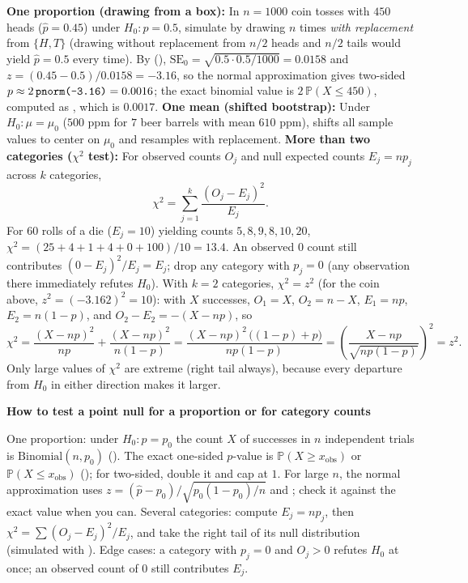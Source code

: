 \documentclass[10pt]{scrartcl}
\newenvironment{howto}[1]{\begin{mdframed}[style=howtostyle]{\color{NavyBlue}\textbf{#1}}\par\vspace{2pt}}{\end{mdframed}}
\begin{document}
\begin{itemize}
  \ii \textbf{One proportion (drawing from a box):} In $n = 1000$ coin tosses with $450$ heads ($\hat p = 0.45$) under $H_0\colon p = 0.5$, simulate by drawing $n$ times \emph{with replacement} from $\{H, T\}$ (drawing without replacement from $n/2$ heads and $n/2$ tails would yield $\hat p = 0.5$ every time). By (), $\mathrm{SE}_0 = \sqrt{0.5 \cdot 0.5 / 1000} = 0.0158$ and $z = (0.45 - 0.5)/0.0158 = -3.16$, so the normal approximation gives two-sided $p \approx 2\,\texttt{pnorm(-3.16)} = 0.0016$; the exact binomial value is $2\,\mathbb P(X \le 450)$, computed as , which is $0.0017$.
  \ii \textbf{One mean (shifted bootstrap):} Under $H_0\colon \mu = \mu_0$ ($500\text{ ppm}$ for $7$ beer barrels with mean $610\text{ ppm}$),  shifts all sample values to center on $\mu_0$ and resamples with replacement.
  \ii \textbf{More than two categories ($\chi^2$ test):} For observed counts $O_j$ and null expected counts $E_j = np_j$ across $k$ categories,
  \[
    \chi^2 = \sum_{j=1}^k \frac{(O_j - E_j)^2}{E_j}.
  \]
  For $60$ rolls of a die ($E_j = 10$) yielding counts $5, 8, 9, 8, 10, 20$, $\chi^2 = (25+4+1+4+0+100)/10 = 13.4$. An observed $0$ count still contributes $(0 - E_j)^2/E_j = E_j$; drop any category with $p_j = 0$ (any observation there immediately refutes $H_0$). With $k = 2$ categories, $\chi^2 = z^2$ (for the coin above, $z^2 = (-3.162)^2 = 10$): with $X$ successes, $O_1 = X$, $O_2 = n - X$, $E_1 = np$, $E_2 = n(1-p)$, and $O_2 - E_2 = -(X - np)$, so
  \[
    \chi^2 = \frac{(X-np)^2}{np} + \frac{(X-np)^2}{n(1-p)} = \frac{(X-np)^2\,\big((1-p) + p\big)}{np(1-p)} = \left(\frac{X - np}{\sqrt{np(1-p)}}\right)^2 = z^2 .
  \]
  Only large values of $\chi^2$ are extreme (right tail always), because every departure from $H_0$ in either direction makes it larger.
\end{itemize}

\begin{howto}{How to test a point null for a proportion or for category counts}
\begin{steps}
  \ii One proportion: under $H_0\colon p = p_0$ the count $X$ of successes in $n$ independent trials is $\mathrm{Binomial}(n, p_0)$ (). The exact one-sided $p$-value is $\mathbb P(X \ge x_{\text{obs}})$ or $\mathbb P(X \le x_{\text{obs}})$ (); for two-sided, double it and cap at $1$.
  \ii For large $n$, the normal approximation uses $z = (\hat p - p_0)/\sqrt{p_0(1-p_0)/n}$ and ; check it against the exact value when you can.
  \ii Several categories: compute $E_j = np_j$, then $\chi^2 = \sum (O_j - E_j)^2/E_j$, and take the right tail of its null distribution (simulated with ).
  \ii Edge cases: a category with $p_j = 0$ and $O_j > 0$ refutes $H_0$ at once; an observed count of $0$ still contributes $E_j$.
\end{steps}
\end{howto}
\end{document}
